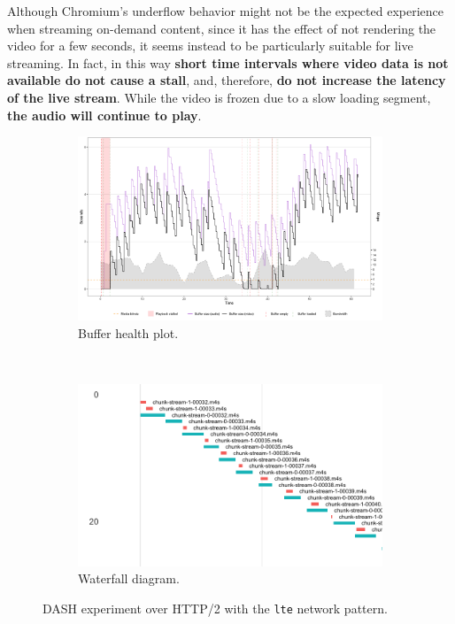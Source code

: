 Although Chromium's underflow behavior might not be the expected experience when streaming on-demand content, since it has the effect of not rendering the video for a few seconds, it seems instead to be particularly suitable for live streaming. In fact, in this way \textbf{short time intervals where video data is not available do not cause a stall}, and, therefore, \textbf{do not increase the latency of the live stream}. While the video is frozen due to a slow loading segment, \textbf{the audio will continue to play}.

\begin{figure}[h]
	\centering
	
	\begin{subfigure}[t]{0.5\textwidth}
		\centering
		\includegraphics[width=\textwidth]{res/eval_nonabr_lte_h2.png}
		\caption{Buffer health plot.}
		\label{fig:eval_nonabr_lte_h2_buffer}
	\end{subfigure}%
	~ 
	\begin{subfigure}[t]{0.5\textwidth}
		\centering
		\includegraphics[width=\textwidth]{res/eval_nonabr_lte_h2_waterfall.png}
		\caption{Waterfall diagram.}
		\label{fig:eval_nonabr_lte_h2_waterfall}
	\end{subfigure}
	
	\caption{DASH experiment over HTTP/2 with the \texttt{lte} network pattern.}
	\label{fig:eval_nonabr_lte_h2}
\end{figure}

